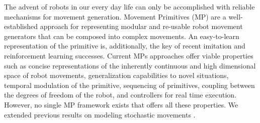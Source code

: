 \documentclass[final,5p,twocolumn]{elsarticle}
\begin{document}
The advent of robots in our every day life can only be accomplished with
reliable mechanisms for movement generation.  Movement Primitives (MP) are a
well-established approach for representing modular and re-usable robot movement
generators that can be composed into complex movements.  An easy-to-learn
representation of the primitive is, additionally, the key of recent imitation
and reinforcement learning successes. Current MPs approaches offer viable
properties such as concise representations of the inherently continuous and
high dimensional space of robot movements, generalization capabilities to novel
situations, temporal modulation of the primitive, sequencing of primitives,
coupling between the degrees of freedom of the robot, and controllers for real
time execution. However, no single MP framework exists that offers all these
properties.  We extended previous results on modeling stochastic movements \cite{Paraschos2013,Paraschos2013a}. 


\newcommand{\hockeyImLabel}[3]{%
\begin{tikzpicture}
\node[  anchor=south west,inner sep=0,%
        draw=gray,%
] (image) at (0,0){
\texttt{[image: \#1]}};
\begin{scope}[x={(image.south east)},y={(image.north west)}]
    \node [fill=white,opacity=0.6,above right,font=\large] at (0.01,0.01) {#2};
    \node [fill=white,opacity=0.6,below left,font=\large] at (0.99,0.99) {#3};
\end{scope}
\begin{scope}[x={(image.south east)},%
              y={(image.north west)},%
              on background layer]
    \path[outer color=light-gray,inner color=white] (0,0) rectangle (1,1);
    \draw[gray,opacity=0.15,xstep=.1,ystep=.1] (0,0) grid (1,1);
\end{scope}
\end{tikzpicture}%
}
\end{document}
